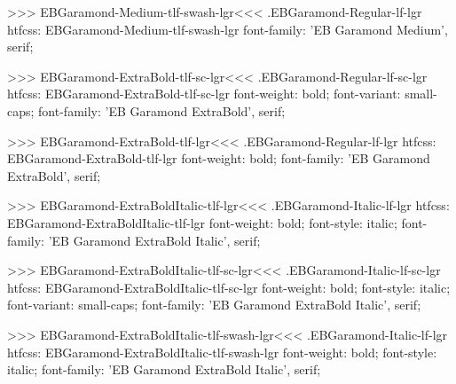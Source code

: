 >>>
\<EBGaramond-Medium-tlf-swash-lgr\><<<
.EBGaramond-Regular-lf-lgr
htfcss:  EBGaramond-Medium-tlf-swash-lgr  font-family: 'EB Garamond Medium', serif;

>>>
\<EBGaramond-ExtraBold-tlf-sc-lgr\><<<
.EBGaramond-Regular-lf-sc-lgr
htfcss:  EBGaramond-ExtraBold-tlf-sc-lgr  font-weight: bold; font-variant: small-caps; font-family: 'EB Garamond ExtraBold', serif;

>>>
\<EBGaramond-ExtraBold-tlf-lgr\><<<
.EBGaramond-Regular-lf-lgr
htfcss:  EBGaramond-ExtraBold-tlf-lgr  font-weight: bold; font-family: 'EB Garamond ExtraBold', serif;

>>>
\<EBGaramond-ExtraBoldItalic-tlf-lgr\><<<
.EBGaramond-Italic-lf-lgr
htfcss:  EBGaramond-ExtraBoldItalic-tlf-lgr  font-weight: bold; font-style: italic; font-family: 'EB Garamond ExtraBold Italic', serif;

>>>
\<EBGaramond-ExtraBoldItalic-tlf-sc-lgr\><<<
.EBGaramond-Italic-lf-sc-lgr
htfcss:  EBGaramond-ExtraBoldItalic-tlf-sc-lgr  font-weight: bold; font-style: italic; font-variant: small-caps; font-family: 'EB Garamond ExtraBold Italic', serif;

>>>
\<EBGaramond-ExtraBoldItalic-tlf-swash-lgr\><<<
.EBGaramond-Italic-lf-lgr
htfcss:  EBGaramond-ExtraBoldItalic-tlf-swash-lgr  font-weight: bold; font-style: italic; font-family: 'EB Garamond ExtraBold Italic', serif;


